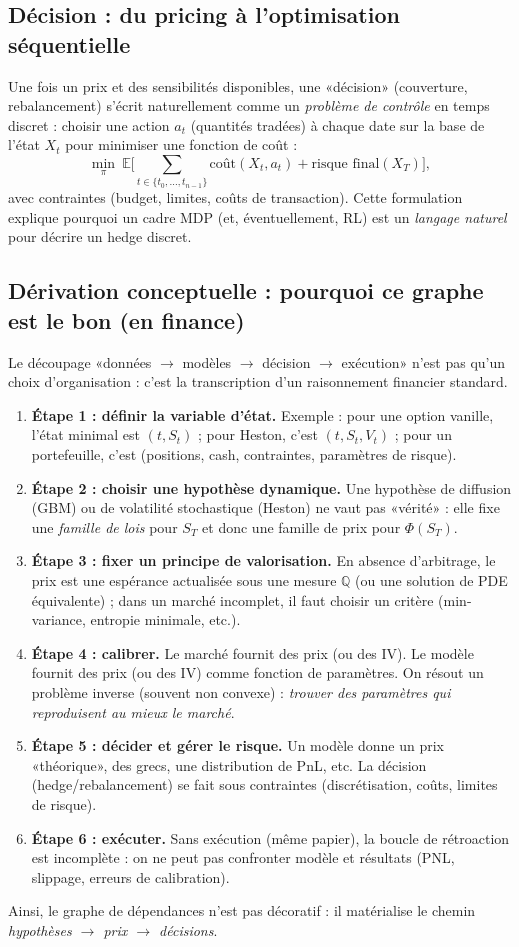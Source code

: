 \documentclass[11pt,a4paper]{report}
\theoremstyle{definition}
\theoremstyle{plain}
\theoremstyle{remark}
\newcommand{\E}{\mathbb{E}}
\newcommand{\1}{\mathbf{1}}
\newcommand{\Qmeas}{\mathbb{Q}}
\begin{document}
\subsection*{Décision : du pricing à l'optimisation séquentielle}
Une fois un prix et des sensibilités disponibles, une «décision» (couverture, rebalancement) s'écrit naturellement comme un \emph{problème de contrôle} en temps discret :
choisir une action $a_t$ (quantités tradées) à chaque date sur la base de l'état $X_t$ pour minimiser une fonction de coût :
\[
\min_{\pi}\ \E\Big[\sum_{t\in\{t_0,\ldots,t_{n-1}\}} \text{coût}(X_t,a_t)+\text{risque final}(X_T)\Big],
\]
avec contraintes (budget, limites, coûts de transaction). Cette formulation explique pourquoi un cadre MDP (et, éventuellement, RL) est un \emph{langage naturel} pour décrire un hedge discret.

\subsection*{Dérivation conceptuelle : pourquoi ce graphe est le bon (en finance)}
Le découpage «données $\to$ modèles $\to$ décision $\to$ exécution» n'est pas qu'un choix d'organisation : c'est la transcription d'un raisonnement financier standard.
\begin{enumerate}[leftmargin=*]
\item \textbf{Étape 1 : définir la variable d'état.} Exemple : pour une option vanille, l'état minimal est $(t,S_t)$ ; pour Heston, c'est $(t,S_t,V_t)$ ; pour un portefeuille, c'est (positions, cash, contraintes, paramètres de risque).
\item \textbf{Étape 2 : choisir une hypothèse dynamique.} Une hypothèse de diffusion (GBM) ou de volatilité stochastique (Heston) ne vaut pas «vérité» : elle fixe une \emph{famille de lois} pour $S_T$ et donc une famille de prix pour $\Phi(S_T)$.
\item \textbf{Étape 3 : fixer un principe de valorisation.} En absence d'arbitrage, le prix est une espérance actualisée sous une mesure $\Qmeas$ (ou une solution de PDE équivalente) ; dans un marché incomplet, il faut choisir un critère (min-variance, entropie minimale, etc.).
\item \textbf{Étape 4 : calibrer.} Le marché fournit des prix (ou des IV). Le modèle fournit des prix (ou des IV) comme fonction de paramètres. On résout un problème inverse (souvent non convexe) : \emph{trouver des paramètres qui reproduisent au mieux le marché}.
\item \textbf{Étape 5 : décider et gérer le risque.} Un modèle donne un prix «théorique», des grecs, une distribution de PnL, etc. La décision (hedge/rebalancement) se fait sous contraintes (discrétisation, coûts, limites de risque).
\item \textbf{Étape 6 : exécuter.} Sans exécution (même papier), la boucle de rétroaction est incomplète : on ne peut pas confronter modèle et résultats (PNL, slippage, erreurs de calibration).
\end{enumerate}
Ainsi, le graphe de dépendances n'est pas décoratif : il matérialise le chemin \emph{hypothèses $\to$ prix $\to$ décisions}.
\end{document}
